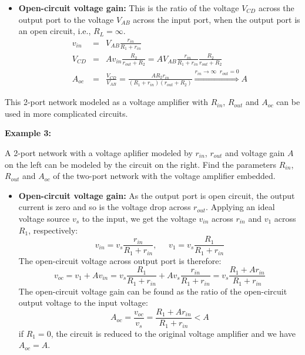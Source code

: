 \begin{itemize}
\begin{itemize}
\item {\bf Open-circuit voltage gain:} This is the ratio of the voltage $V_{CD}$
  across the output port to the voltage $V_{AB}$ across the input port, when the
  output port is an open circuit, i.e., $R_L=\infty$. 
  \begin{eqnarray}
    v_{in}&=&V_{AB}\frac{r_{in}}{R_1+r_{in}}  \nonumber \\
    V_{CD}&=&A v_{in} \frac{R_2}{r_{out}+R_2}=A V_{AB}\frac{r_{in}}{R_1+r_{in}} 
    \frac{R_2}{r_{out}+R_2} \nonumber \\
    A_{oc}&=&\frac{V_{CD}}{V_{AB}}=\frac{A R_2 r_{in}}{(R_1+r_{in})(r_{out}+R_2)} 
    \stackrel{r_{in}\rightarrow\infty\;\;r_{out}=0}{\Longrightarrow}A
    \nonumber 
  \end{eqnarray}
\end{itemize}
This 2-port network modeled as a voltage amplifier with $R_{in}$, $R_{out}$
and $A_{oc}$ can be used in more complicated circuits.

{\bf Example 3:} 

A 2-port network with a voltage aplifier modeled by $r_{in}$, $r_{out}$ and
voltage gain $A$ on the left can be modeled by the circuit on the right. 
Find the parameters $R_{in}$, $R_{out}$ and $A_{oc}$ of the two-port network 
with the voltage amplifier embedded.


\begin{itemize}
\item {\bf Open-circuit voltage gain:} As the output port is open circuit, 
  the output current is zero and so is the voltage drop across $r_{out}$.
  Applying an ideal voltage source $v_s$ to the input, we get the voltage 
  $v_{in}$ across $r_{in}$ and $v_1$ across $R_1$, respectively:
  \[
  v_{in}=v_s \frac{r_{in}}{R_1+r_{in}},\;\;\;\;\;
  v_1=v_s \frac{R_1}{R_1+r_{in}} 
  \]
  The open-circuit voltage across output port is therefore:
  \[
  v_{oc}=v_1+A v_{in}=v_s \frac{R_1}{R_1+r_{in}}+Av_s\frac{r_{in}}{R_1+r_{in}}
  =v_s \frac{R_1+A r_{in}}{R_1+r_{in}}  
  \]
  The open-circuit voltage gain can be found as the ratio of the open-circuit
  output voltage to the input voltage:
  \[
  A_{oc}=\frac{v_{oc}}{v_s}=\frac{R_1+A r_{in}}{R_1+r_{in}}<A  
  \]
  if $R_1=0$, the circuit is reduced to the original voltage amplifier and we
  have $A_{oc}=A$.


\end{itemize}
\end{itemize}
